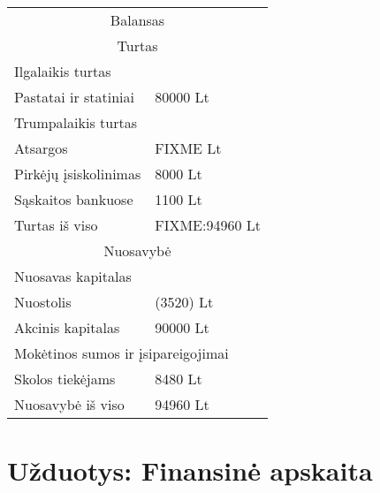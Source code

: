 \begin{tasks}
\begin{task}
\begin{solution}
      \begin{tabularx}{\tablewidth}[]{l | X}
        \multicolumn{2}{c}{Balansas} \\
        \multicolumn{2}{c}{Turtas} \\
        \hline
        \multicolumn{2}{l}{Ilgalaikis turtas} \\
        Pastatai ir statiniai & 80000 Lt \\
        \multicolumn{2}{l}{Trumpalaikis turtas} \\
        Atsargos & FIXME Lt \\
        Pirkėjų įsiskolinimas & 8000 Lt \\
        Sąskaitos bankuose & 1100 Lt \\
        \hline
        Turtas iš viso & FIXME:94960 Lt \\
        \multicolumn{2}{c}{Nuosavybė} \\
        \hline
        \multicolumn{2}{l}{Nuosavas kapitalas} \\
        Nuostolis & (3520) Lt \\
        Akcinis kapitalas & 90000 Lt \\
        \multicolumn{2}{l}{Mokėtinos sumos ir įsipareigojimai} \\
        Skolos tiekėjams & 8480 Lt \\
        \hline
        Nuosavybė iš viso & 94960 Lt \\
      \end{tabularx}

    \end{solution}
  \end{task}

\end{tasks}

\chapter{Užduotys: Finansinė apskaita}



